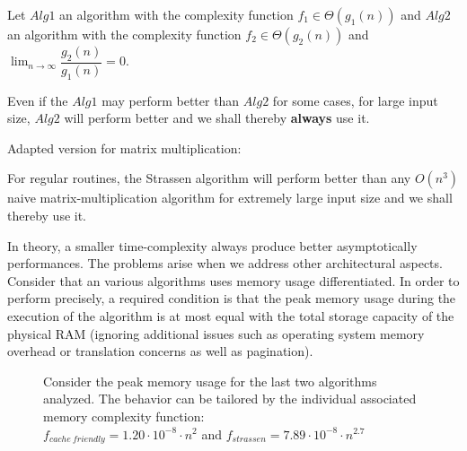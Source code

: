 \begin{pitfall}
Let $Alg1$ an algorithm with the complexity function $f_{1} \in \Theta(g_1(n))$  and $Alg2$ an algorithm with the complexity function $f_{2} \in \Theta(g_2(n))$ and $\lim_{n\to\infty} \dfrac{g_2(n)}{g_1(n)} = 0$.

Even if the $Alg1$ may perform better than $Alg2$ for some cases, for large input size, $Alg2$ will perform better and we shall thereby \textbf{always} use it.
\end{pitfall}

\begin{pitfall}
Adapted version for matrix multiplication:

For regular routines, the Strassen algorithm will perform better than any $O(n^3)$ naive matrix-multiplication algorithm for extremely large input size and we shall thereby use it.
\end{pitfall}

In theory, a smaller time-complexity always produce better asymptotically performances. The problems arise when we address other architectural aspects. Consider that an various algorithms uses memory usage differentiated. In order to perform precisely, a required condition is that the peak memory usage during the execution of the algorithm is at most equal with the total storage capacity of the physical RAM (ignoring additional issues such as operating system memory overhead or translation concerns as well as pagination).


\begin{figure}[H]
\caption{ Consider the peak memory usage for the last two algorithms analyzed. The behavior can be tailored by the individual associated memory complexity function: \\ $f_{cache\ friendly} = 1.20 \cdot 10^{-8} \cdot n^2 $ and  $f_{strassen} = 7.89 \cdot 10^{-8} \cdot n^{2.7} $ }
\end{figure}

